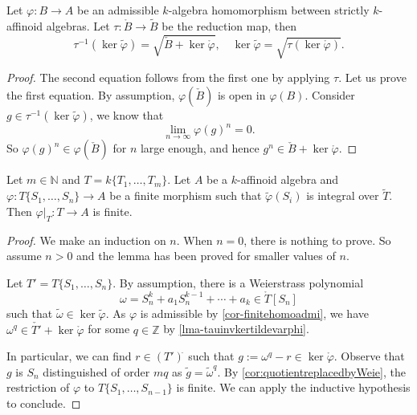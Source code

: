 \begin{lemma}\label{lma-tauinvkertildevarphi}
    Let $\varphi:B\rightarrow A$ be an admissible $k$-algebra homomorphism between strictly $k$-affinoid algebras. Let $\tau:\mathring{B}\rightarrow \tilde{B}$ be the reduction map, then
    \[
        \tau^{-1} (\ker\tilde{\varphi} )=\sqrt{\check{B}+\ker \mathring{\varphi}},\quad \ker\tilde{\varphi}=\sqrt{\tau(\ker \mathring{\varphi})}. 
    \]
\end{lemma}
\begin{proof}
    The second equation follows from the first one by applying $\tau$. Let us prove the first equation. By assumption, $\varphi(\check{B})$ is open in $\varphi(B)$. Consider $g\in \tau^{-1}(\ker\tilde{\varphi} )$, we know that
    \[
        \lim_{n\to\infty} \varphi(g)^n=0.  
    \]
    So $\varphi(g)^n\in \varphi(\check{B})$ for $n$ large enough, and hence $g^n\in \check{B}+\ker \mathring{\varphi}$.
\end{proof}

\begin{lemma}\label{lma-varphirestfinite}
    Let $m\in \mathbb{N}$ and $T=k\{T_1,\ldots,T_m\}$. Let $A$ be a $k$-affinoid algebra and $\varphi:T\{S_1,\ldots,S_n\}\rightarrow A$ be a finite morphism such that $\tilde{\varphi}(S_i)$ is integral over $\tilde{T}$. Then $\varphi|_T:T\rightarrow A$ is finite.
\end{lemma}
\begin{proof}
    We make an induction on $n$. When $n=0$, there is nothing to prove. So assume $n>0$ and the lemma has been proved for smaller values of $n$.

    Let $T'=T\{S_1,\ldots,S_n\}$. By assumption, there is a Weierstrass polynomial
    \[
        \omega=S_n^k+a_1S_n^{k-1}+\cdots+a_k\in \mathring{T}[S_n]  
    \]
    such that $\tilde{\omega}\in \ker\tilde{\varphi}$. As $\varphi$ is admissible by \cref{cor-finitehomoadmi}, we have $\omega^q\in \check{T'}+\ker \mathring{\varphi}$ for some $q\in \mathbb{Z}$ by \cref{lma-tauinvkertildevarphi}.

    In particular, we can find $r\in (T')^{\check{}}$ such that $g:=\omega^q-r\in \ker\mathring{\varphi}$. Observe that $g$ is $S_n$ distinguished of order $mq$ as $\tilde{g}=\tilde{\omega}^q$. By \cref{cor:quotientreplacedbyWeie}, the restriction of $\varphi$ to $T\{S_1,\ldots,S_{n-1}\}$ is finite. We can apply the inductive hypothesis to conclude.
\end{proof}

